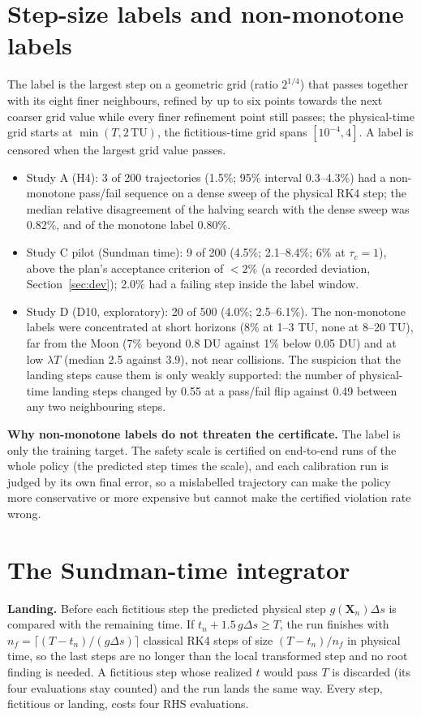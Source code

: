 \documentclass[10pt,letterpaper]{article}
\begin{document}
\section{Step-size labels and non-monotone labels}
\label{sec:labels}
The label is the largest step on a geometric grid (ratio $2^{1/4}$) that passes together with its eight finer neighbours, refined by up to six
points towards the next coarser grid value while every finer refinement point still passes; the physical-time grid starts at $\min(T, 2\,\mathrm{TU})$,
the fictitious-time grid spans $[10^{-4}, 4]$. A label is censored when the largest grid value passes.
\begin{itemize}
\item Study A (H4): 3 of 200 trajectories (1.5\%; 95\% interval 0.3--4.3\%) had a non-monotone pass/fail sequence on a dense sweep of the physical RK4
step; the median relative disagreement of the halving search with the dense sweep was 0.82\%, and of the monotone label 0.80\%.
\item Study C pilot (Sundman time): 9 of 200 (4.5\%; 2.1--8.4\%; 6\% at $\tau_c = 1$), above the plan's acceptance criterion of $<2\%$ (a recorded
deviation, Section~\ref{sec:dev}); 2.0\% had a failing step inside the label window.
\item Study D (D10, exploratory): 20 of 500 (4.0\%; 2.5--6.1\%). The non-monotone labels were concentrated at short horizons (8\% at 1--3 TU, none at
8--20 TU), far from the Moon (7\% beyond 0.8 DU against 1\% below 0.05 DU) and at low $\lambda T$ (median 2.5 against 3.9), not near collisions.
The suspicion that the landing steps cause them is only weakly supported: the number of physical-time landing steps changed by 0.55 at a
pass/fail flip against 0.49 between any two neighbouring steps.
\end{itemize}
\textbf{Why non-monotone labels do not threaten the certificate.} The label is only the training target. The safety scale is certified on
end-to-end runs of the whole policy (the predicted step times the scale), and each calibration run is judged by its own final error, so a
mislabelled trajectory can make the policy more conservative or more expensive but cannot make the certified violation rate wrong.

\section{The Sundman-time integrator}
\label{sec:sundman}
\textbf{Landing.} Before each fictitious step the predicted physical step $g(\boldsymbol{X}_n)\Delta s$ is compared with the remaining time. If
$t_n + 1.5\,g\Delta s \ge T$, the run finishes with $n_f = \lceil (T-t_n)/(g\Delta s)\rceil$ classical RK4 steps of size $(T-t_n)/n_f$ in physical
time, so the last steps are no longer than the local transformed step and no root finding is needed. A fictitious step whose realized $t$ would
pass $T$ is discarded (its four evaluations stay counted) and the run lands the same way. Every step, fictitious or landing, costs four RHS
evaluations.
\end{document}
